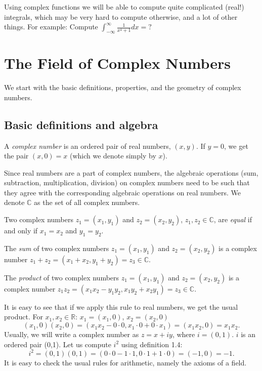 Using complex functions we will be able to compute quite complicated (real!) integrals, which may be very hard to compute otherwise, and a lot of other things. For example: Compute $\int_{-\infty}^{\infty} \frac{1}{x^4+1} dx = ?$

\section{The Field of Complex Numbers}

We start with the basic definitions, properties, and the geometry of complex numbers.

\subsection{Basic definitions and algebra}

\begin{definition}
A \emph{complex number} is an ordered pair of real numbers, $(x, y)$.  If $y = 0$, we get the pair $(x, 0) = x$ (which we denote simply by $x$).
\end{definition}

Since real numbers are a part of complex numbers, the algebraic operations (sum, subtraction, multiplication, division) on complex numbers need to be such that they agree with the corresponding algebraic operations on real numbers.  We denote $\mathbb{C}$ as the set of all complex numbers.

\begin{definition}
Two complex numbers $z_1 = (x_1, y_1)$ and $z_2 = (x_2, y_2)$, $z_1, z_2 \in \mathbb{C}$, are \emph{equal} if and only if $x_1 = x_2$ and $y_1 = y_2$.
\end{definition}

\begin{definition}
The \emph{sum} of two complex numbers $z_1 = (x_1, y_1)$ and $z_2 = (x_2, y_2)$ is a complex number $z_1 + z_2 = (x_1 + x_2, y_1 + y_2) = z_3 \in \mathbb{C}$.
\end{definition}

\begin{definition}
The \emph{product} of two complex numbers $z_1 = (x_1, y_1)$ and $z_2 = (x_2, y_2)$ is a complex number $z_1 z_2 = (x_1 x_2 - y_1 y_2, x_1 y_2 + x_2 y_1) = z_3 \in \mathbb{C}$.
\end{definition}
It is easy to see that if we apply this rule to real numbers, we get the usual product.
For $x_1,x_2 \in \mathbb{R}$: $x_1=(x_1,0)$, $x_2=(x_2,0)$
\[ (x_1,0)(x_2,0) = (x_1x_2-0 \cdot 0, x_1 \cdot 0 + 0 \cdot x_1) = (x_1x_2,0) = x_1x_2. \]
Usually, we will write a complex number as $z=x+iy$, where $i=(0,1)$.  $i$ is an ordered pair (0,1).
Let us compute $i^2$ using definition 1.4:
\[ i^2 = (0,1)(0,1) = (0 \cdot 0 - 1 \cdot 1, 0 \cdot 1+ 1\cdot 0) = (-1,0) = -1. \]
It is easy to check the usual rules for arithmetic, namely the axioms of a field.

